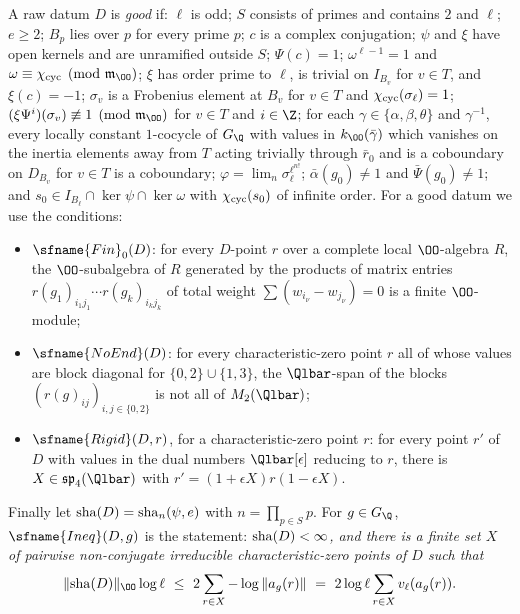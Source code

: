 \begin{definition}\label{pf:modularity:good}
A raw datum $D$ is \emph{good} if: $\ell$ is odd; $S$ consists of primes and contains $2$ and $\ell$; $e\ge2$; $B_p$
lies over $p$ for every prime $p$; $c$ is a complex conjugation; $\psi$ and $\xi$ have open kernels and are unramified
outside $S$; $\Psi(c)=1$; $\omega^{\ell-1}=1$ and $\omega\equiv\modularitycyc\pmod{\mathfrak m_\OO}$; $\xi$ has order
prime to $\ell$, is trivial on $I_{B_v}$ for $v\in T$, and $\xi(c)=-1$; $\sigma_v$ is a Frobenius element at $B_v$ for
$v\in T$ and $\chi_{\mathrm{cyc}}(\sigma_\ell)=1$; $(\xi\Psi^i)(\sigma_v)\not\equiv1\pmod{\mathfrak m_\OO}$ for $v\in T$ and
$i\in\Z$; for each $\gamma\in\{\alpha,\beta,\theta\}$ and $\gamma^{-1}$, every locally constant $1$-cocycle of $G_\Q$
with values in $k_\OO(\bar\gamma)$ which vanishes on the inertia elements away from $T$ acting trivially through
$\bar r_0$ and is a coboundary on $D_{B_v}$ for $v\in T$ is a coboundary; $\varphi=\lim_n\sigma_\ell^{\ell^{n!}}$;
$\bar\alpha(g_0)\ne1$ and $\bar\Psi(g_0)\ne1$; and $s_0\in I_{B_\ell}\cap\ker\psi\cap\ker\omega$ with
$\chi_{\mathrm{cyc}}(s_0)$ of infinite order. For a good datum we use the conditions:
\begin{itemize}
\item $\sfname{Fin}_0(D)$: for every $D$-point $r$ over a complete local $\OO$-algebra $R$, the $\OO$-subalgebra of $R$
generated by the products of matrix entries $r(g_1)_{i_1j_1}\cdots r(g_k)_{i_kj_k}$ of total weight
$\sum(w_{i_\nu}-w_{j_\nu})=0$ is a finite $\OO$-module;
\item $\sfname{NoEnd}(D)$: for every characteristic-zero point $r$ all of whose values are block diagonal for
$\{0,2\}\cup\{1,3\}$, the $\Qlbar$-span of the blocks $(r(g)_{ij})_{i,j\in\{0,2\}}$ is not all of $M_2(\Qlbar)$;
\item $\sfname{Rigid}(D,r)$, for a characteristic-zero point $r$: for every point $r'$ of $D$ with values in the dual
numbers $\Qlbar[\epsilon]$ reducing to $r$, there is $X\in\mathfrak{sp}_4(\Qlbar)$ with
$r'=(1+\epsilon X)r(1-\epsilon X)$.
\end{itemize}
Finally let $\mathrm{sha}(D)=\mathrm{sha}_n(\psi,e)$ with $n=\prod_{p\in S}p$. For $g\in G_\Q$, $\sfname{Ineq}(D,g)$
is the statement: \emph{$\mathrm{sha}(D)<\infty$, and there is a finite set $X$ of pairwise non-conjugate irreducible
characteristic-zero points of $D$ such that}
\begin{equation}\label{pf:modularity:ineqdef}
\|\modularitySha(D)\|_\OO\log\ell\ \le\ 2\sum_{r\in X}-\log\|a_g(r)\|\ =\ 2\log\ell\sum_{r\in X}v_\ell(a_g(r)).
\end{equation}
\end{definition}

